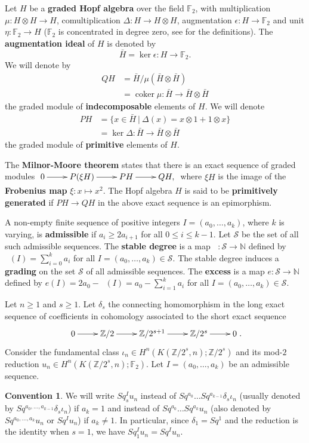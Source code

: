 \documentclass{amsart}
\theoremstyle{definition}
\newtheorem*{conv*}{Convention}
\theoremstyle{remark}
\DeclareMathOperator{\degst}{deg_{st}}
\DeclareMathOperator{\coker}{coker}
\newcommand{\N}{\mathbb{N}}
\newcommand{\Z}{\mathbb{Z}}
\newcommand{\F}{\mathbb{F}}
\renewcommand{\geq}{\geqslant}
\renewcommand{\leq}{\leqslant}
\begin{document}
Let $H$ be a {\bf graded Hopf algebra} over the field $\F_2$, with multiplication $\mu:H\otimes H\to H$, comultiplication $\Delta:H\to H\otimes H$, augmentation $\epsilon:H\to\F_2$ and unit $\eta:\F_2\to H$ ($\F_2$ is concentrated in degree zero, see \cite{MM65} for the definitions). The {\bf augmentation ideal} of $H$ is denoted by
$$
\bar{H}=\ker\epsilon:H\to\F_2.
$$ We will denote  by
\begin{align*}
QH&=\bar{H}/\mu(\bar{H}\otimes\bar{H})\\
&=\coker \mu:\bar{H}\to\bar{H}\otimes\bar{H}
\end{align*}
the graded module of {\bf indecomposable} elements of $H$. We will denote
\begin{align*}
PH&=\{x\in\bar{H}\ |\ \Delta(x)=x\otimes1+1\otimes x\}\\
&=\ker \Delta:\bar{H}\to\bar{H}\otimes\bar{H}
\end{align*}
the graded module of {\bf primitive} elements of $H$.  

The {\bf Milnor-Moore theorem}\label{t:Milnor-Moore} states that there is an exact sequence of graded modules
$\xymatrix{
0\ar[r] &P(\xi H)\ar[r] &PH\ar[r] &QH,
}$ where $\xi H$ is the image of the {\bf Frobenius map} $\xi:x\mapsto x^2$. The Hopf algebra $H$ is said to be {\bf primitively generated} if $PH\to QH$ in the above exact sequence is an epimorphism.

A non-empty finite sequence of positive integers $I=(a_0,\dots,a_k)$, where $k$ is varying, is {\bf admissible} if $a_i\geq2a_{i+1}$ for all $0\leq i\leq k-1$. Let $\mathcal S$ be the set of all such admissible sequences. The {\bf stable degree} is a map $\degst:{\mathcal S}\to\N$ defined by $\degst(I)=\sum_{i=0}^k a_i$ for all $I=(a_0,\dots,a_k)\in{\mathcal S}$. The stable degree induces a {\bf grading} on the set $\mathcal S$ of all admissible sequences. The {\bf excess} is a map $e:{\mathcal S}\to\N$ defined by $e(I)=2a_0-\degst(I)=a_0-\sum_{i=1}^k a_i$ for all $I=(a_0,\dots,a_k)\in{\mathcal S}$.

Let $n\geq1$ and $s\geq1$. Let $\delta_s$ the connecting homomorphism in the long exact sequence of coefficients in cohomology associated to the short exact sequence
$$\xymatrix{0\ar[r] &\Z/2\ar[r] &\Z/2^{s+1}\ar[r] &\Z/2^s\ar[r] &0}.$$ 
Consider the fundamental class $\iota_n\in H^n(K(\Z/2^s,n);\Z/2^s)$ and its mod-$2$ reduction $u_n\in H^n(K(\Z/2^s,n);\F_2)$. Let $I=(a_0,\dots,a_k)$ be an admissible sequence.
\begin{conv*}
We will write $Sq^I_s u_n$ instead of $Sq^{a_0}\dots Sq^{a_{k-1}}\delta_s\iota_n$ (usually denoted by $Sq^{a_0,\dots,a_{k-1}}\delta_s\iota_n$) if $a_k=1$ and instead of $Sq^{a_0}\dots Sq^{a_k} u_n$ (also denoted by $Sq^{a_0,\dots,a_k} u_n$ or $Sq^I u_n$) if $a_k\not=1$. In particular, since $\delta_1=Sq^1$ and the reduction is the identity when $s=1$, we have $Sq^I_1 u_n=Sq^I u_n$.
\end{conv*}
\end{document}
